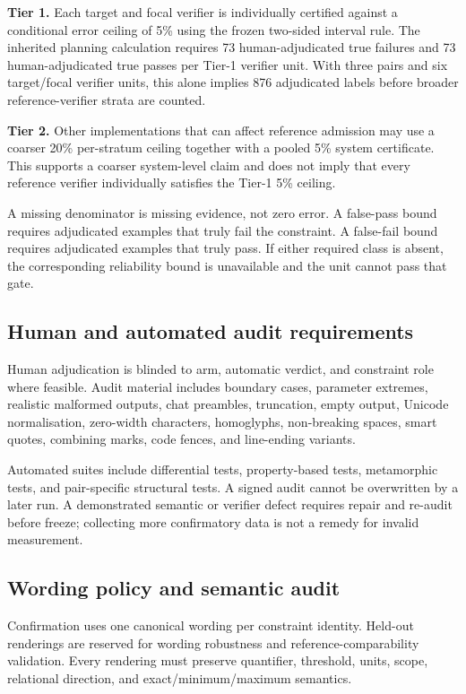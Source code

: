\documentclass[11pt,a4paper]{article}
\begin{document}
\textbf{Tier 1.} Each target and focal verifier is individually certified against a conditional error ceiling of 5\% using the frozen two-sided interval rule. The inherited planning calculation requires 73 human-adjudicated true failures and 73 human-adjudicated true passes per Tier-1 verifier unit. With three pairs and six target/focal verifier units, this alone implies 876 adjudicated labels before broader reference-verifier strata are counted.

\textbf{Tier 2.} Other implementations that can affect reference admission may use a coarser 20\% per-stratum ceiling together with a pooled 5\% system certificate. This supports a coarser system-level claim and does not imply that every reference verifier individually satisfies the Tier-1 5\% ceiling.

A missing denominator is missing evidence, not zero error. A false-pass bound requires adjudicated examples that truly fail the constraint. A false-fail bound requires adjudicated examples that truly pass. If either required class is absent, the corresponding reliability bound is unavailable and the unit cannot pass that gate.

\subsection{Human and automated audit requirements}

Human adjudication is blinded to arm, automatic verdict, and constraint role where feasible. Audit material includes boundary cases, parameter extremes, realistic malformed outputs, chat preambles, truncation, empty output, Unicode normalisation, zero-width characters, homoglyphs, non-breaking spaces, smart quotes, combining marks, code fences, and line-ending variants.

Automated suites include differential tests, property-based tests, metamorphic tests, and pair-specific structural tests. A signed audit cannot be overwritten by a later run. A demonstrated semantic or verifier defect requires repair and re-audit before freeze; collecting more confirmatory data is not a remedy for invalid measurement.

\subsection{Wording policy and semantic audit}

Confirmation uses one canonical wording per constraint identity. Held-out renderings are reserved for wording robustness and reference-comparability validation. Every rendering must preserve quantifier, threshold, units, scope, relational direction, and exact/minimum/maximum semantics.
\end{document}
